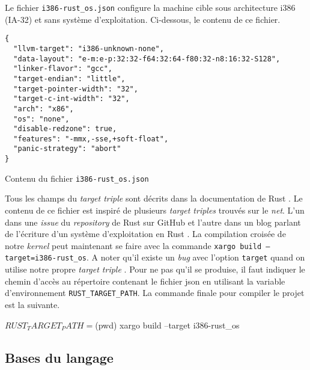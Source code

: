  \bigbreak

Le fichier \texttt{i386-rust_os.json} configure la machine cible
sous architecture i386 (\acrshort{IA-32}) et sans système d'exploitation.
Ci-dessous, le contenu de ce fichier. \\

\begin{code}
\begin{verbatim}
{
  "llvm-target": "i386-unknown-none",
  "data-layout": "e-m:e-p:32:32-f64:32:64-f80:32-n8:16:32-S128",
  "linker-flavor": "gcc",
  "target-endian": "little",
  "target-pointer-width": "32",
  "target-c-int-width": "32",
  "arch": "x86",
  "os": "none",
  "disable-redzone": true,
  "features": "-mmx,-sse,+soft-float",
  "panic-strategy": "abort"
}
\end{verbatim}
\caption{Contenu du fichier \texttt{i386-rust_os.json}}
\label{lst:rust:target}
\end{code} \bigbreak

Tous les champs du \textit{target triple} sont décrits dans la documentation de
Rust \cite{ref4}. Le contenu de ce fichier est inspiré de plusieurs \textit{target triples}
trouvés sur le \textit{net}. L'un dans une \textit{issue} du \textit{repository}
de Rust sur GitHub \cite{ref5} et l'autre dans un blog parlant de l'écriture
d'un système d'exploitation en Rust \cite{ref8}. La compilation croisée de notre
\textit{kernel} peut maintenant se faire avec la commande
\texttt{xargo build --target=i386-rust_os}. A noter qu'il existe un
\textit{bug} avec l'option \texttt{target} quand on utilise notre propre
\textit{target triple} \cite{ref7}. Pour ne pas qu'il se produise, il faut indiquer
le chemin d'accès au répertoire contenant le fichier \acrshort{json} en utilisant
la variable d'environnement \texttt{RUST_TARGET_PATH}. La commande finale
pour compiler le projet est la suivante.

\begin{shellcode}
$ RUST_TARGET_PATH=$(pwd) xargo build --target i386-rust_os
\end{shellcode}


\subsection{Bases du langage}
